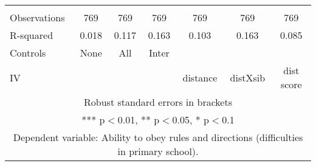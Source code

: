 \begin{tabular}{lcccccc}
 &  &  &  &  &  &  \\
Observations & 769 & 769 & 769 & 769 & 769 & 769 \\
R-squared & 0.018 & 0.117 & 0.163 & 0.103 & 0.163 & 0.085 \\
Controls & None & All & Inter &  &  &  \\
 IV &  &  &  & distance & distXsib & dist score \\ \hline
\multicolumn{7}{c}{ Robust standard errors in brackets} \\
\multicolumn{7}{c}{ *** p$<$0.01, ** p$<$0.05, * p$<$0.1} \\
\multicolumn{7}{c}{ Dependent variable: Ability to obey rules and directions (difficulties in primary school).} \\
\end{tabular}

